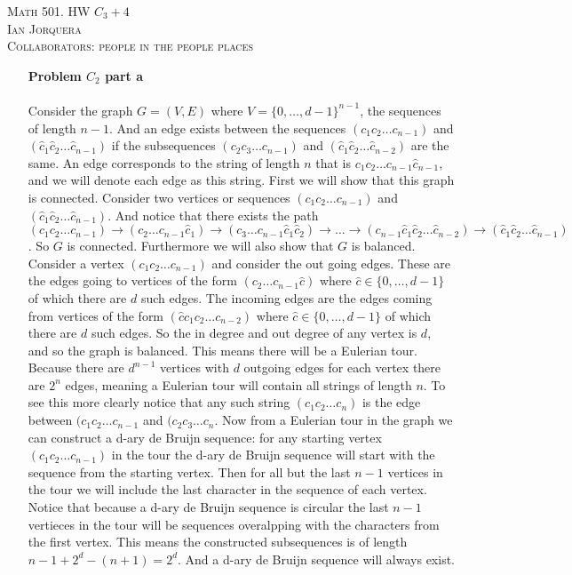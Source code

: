 \documentclass[12pt]{amsart}
\theoremstyle{definition}
\newcommand{\ra}{\rightarrow}
\begin{document}
\begin{center}
    \textsc{Math 501. HW $C_3+4$\\ Ian Jorquera\\ Collaborators: people in the people places}
\end{center}
\vspace{1em}

\begin{itemize}[align=left]
\item[\textbf{Problem $C_2$ part a}] %
    \;\\\\
    Consider the graph $G=(V,E)$ where $V=\{0,\dots,d-1\}^{n-1}$, the sequences of length $n-1$. And an edge exists between the sequences $(c_1c_2\dots c_{n-1})$ and $(\hat{c}_1\hat{c}_2\dots \hat{c}_{n-1})$ if the subsequences $(c_2c_3\dots c_{n-1})$ and $(\hat{c}_1\hat{c}_2\dots \hat{c}_{n-2})$ are the same. An edge corresponds to the string of length $n$ that is $c_1c_2\dots c_{n-1}\hat{c}_{n-1}$, and we will denote each edge as this string. First we will show that this graph is connected. Consider two vertices or sequences $(c_1c_2\dots c_{n-1})$ and $(\hat{c}_1\hat{c}_2\dots \hat{c}_{n-1})$. And notice that there exists the path $(c_1c_2\dots c_{n-1})\ra (c_2\dots c_{n-1}\hat{c}_1)\ra (c_3\dots c_{n-1}\hat{c}_1\hat{c}_2)\ra\dots\ra ({c}_{n-1}\hat{c}_1\hat{c}_2\dots \hat{c}_{n-2})\ra (\hat{c}_1\hat{c}_2\dots \hat{c}_{n-1})$. So $G$ is connected. Furthermore we will also show that $G$ is balanced. Consider a vertex $(c_1c_2\dots c_{n-1})$ and consider the out going edges. These are the edges going to vertices of the form $(c_2\dots c_{n-1}\hat{c})$ where $\hat{c}\in\{0,\dots,d-1\}$ of which there are $d$ such edges. The incoming edges are the edges coming from vertices of the form $(\hat{c}c_1c_2\dots c_{n-2})$ where $\hat{c}\in\{0,\dots,d-1\}$ of which there are $d$ such edges. So the in degree and out degree of any vertex is $d$, and so the graph is balanced. This means there will be a Eulerian tour. Because there are $d^{n-1}$ vertices with $d$ outgoing edges for each vertex there are $2^n$ edges, meaning a Eulerian tour will contain all strings of length $n$. To see this more clearly notice that any such string $(c_1c_2\dots c_{n})$ is the edge between $(c_1c_2\dots c_{n-1}$ and $(c_2c_3\dots c_{n}$. Now from a Eulerian tour in the graph we can construct a d-ary de Bruijn sequence: for any starting vertex $(c_1c_2\dots c_{n-1})$ in the tour the d-ary de Bruijn sequence will start with the sequence from the starting vertex. Then for all but the last $n-1$ vertices in the tour we will include the last character in the sequence of each vertex. Notice that because a d-ary de Bruijn sequence is circular the last $n-1$ vertieces in the tour will be sequences overalpping with the characters from the first vertex. This means the constructed subsequences is of length $n-1+2^{d}-(n+1)=2^d$. And a d-ary de Bruijn sequence will always exist.\\
    

\end{itemize}
\end{document}
